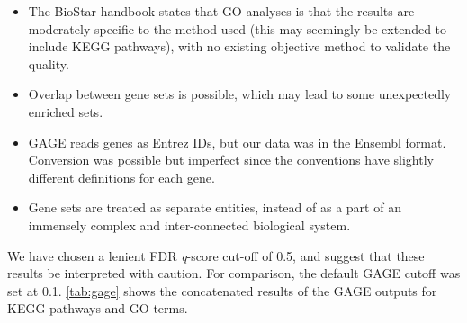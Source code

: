 \begin{itemize}
\item The BioStar handbook \citep{albert2020biostar} states that \ac{GO} analyses is that the results are moderately specific to the method used (this may seemingly be extended to include \ac{KEGG} pathways), with no existing objective method to validate the quality.
\item  Overlap between gene sets is possible, which may lead to some unexpectedly enriched sets. 
\item  GAGE reads genes as Entrez IDs, but our data was in the Ensembl format. Conversion was possible but imperfect since the conventions have slightly different definitions for each gene.
\item Gene sets are treated as separate entities, instead of as a part of an immensely complex and inter-connected biological system.
\end{itemize}

We have chosen a lenient FDR \textit{q}-score cut-off of 0.5, and suggest that these results be interpreted with caution. For comparison, the default GAGE cutoff was set at 0.1. \autoref{tab:gage} shows the concatenated results of the GAGE outputs for \ac{KEGG} pathways and \ac{GO} terms.


